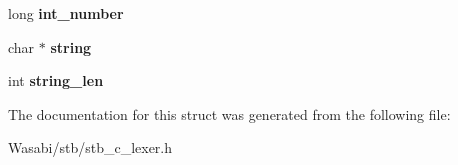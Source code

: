 \begin{DoxyCompactItemize}
\item 
long {\bfseries int\+\_\+number}\hypertarget{structstb__lexer_a01788fce8d0b8cb4a1e93a5e09d503f1}{}\label{structstb__lexer_a01788fce8d0b8cb4a1e93a5e09d503f1}

\item 
char $\ast$ {\bfseries string}\hypertarget{structstb__lexer_a5a2d74bd6f47e944e6f28ac80317eef6}{}\label{structstb__lexer_a5a2d74bd6f47e944e6f28ac80317eef6}

\item 
int {\bfseries string\+\_\+len}\hypertarget{structstb__lexer_acb43c908e6fac6cdd88b4725a56f969e}{}\label{structstb__lexer_acb43c908e6fac6cdd88b4725a56f969e}

\end{DoxyCompactItemize}


The documentation for this struct was generated from the following file\+:\begin{DoxyCompactItemize}
\item 
Wasabi/stb/stb\+\_\+c\+\_\+lexer.\+h\end{DoxyCompactItemize}
